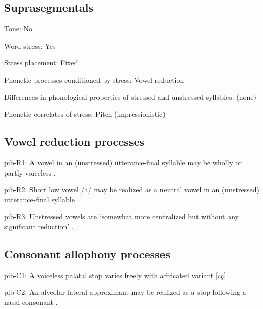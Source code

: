 {\subsection*{Suprasegmentals}
\begin{appendixdesc}
\item[Tone:] No

\item[Word stress:] Yes

\item[Stress placement:] Fixed

\item[Phonetic processes conditioned by stress:] Vowel reduction

\item[Differences in phonological properties of stressed and unstressed syllables:] (none)

\item[Phonetic correlates of stress:] Pitch (impressionistic)
\end{appendixdesc}
\subsection*{Vowel reduction processes}
\begin{appendixdesc}

\item[pib-R1:] A vowel in an (unstressed) utterance-final syllable may be wholly or partly voiceless \citep[23]{Matteson1965}.

\item[pib-R2:] Short low vowel /a/ may be realized as a neutral vowel in an (unstressed) utterance-final syllable \citep[23]{Matteson1965}.

\item[pib-R3:] Unstressed vowels are ‘somewhat more centralized but without any significant reduction’ \citep[16]{Hanson2010}.
\end{appendixdesc}
\subsection*{Consonant allophony processes}
\begin{appendixdesc}

\item[pib-C1:] A voiceless palatal stop varies freely with affricated variant [cç] \citep[17]{Hanson2010}.

\item[pib-C2:] An alveolar lateral approximant may be realized as a stop following a nasal consonant \citep[24]{Hanson2010}.


\end{appendixdesc}}
